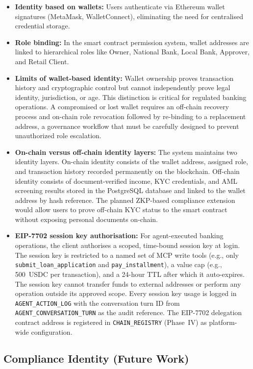 \documentclass[12pt,a4paper]{report}
\begin{document}
\begin{itemize}[noitemsep]
\item \textbf{Identity based on wallets:} Users authenticate via Ethereum wallet signatures (MetaMask, WalletConnect), eliminating the need for centralised credential storage.
\item \textbf{Role binding:} In the smart contract permission system, wallet addresses are linked to hierarchical roles like Owner, National Bank, Local Bank, Approver, and Retail Client.
\item \textbf{Limits of wallet-based identity:} Wallet ownership proves transaction history and cryptographic control but cannot independently prove legal identity, jurisdiction, or age. This distinction is critical for regulated banking operations. A compromised or lost wallet requires an off-chain recovery process and on-chain role revocation followed by re-binding to a replacement address, a governance workflow that must be carefully designed to prevent unauthorized role escalation.
\item \textbf{On-chain versus off-chain identity layers:} The system maintains two identity layers. On-chain identity consists of the wallet address, assigned role, and transaction history recorded permanently on the blockchain. Off-chain identity consists of document-verified income, KYC credentials, and AML screening results stored in the PostgreSQL database and linked to the wallet address by hash reference. The planned ZKP-based compliance extension would allow users to prove off-chain KYC status to the smart contract without exposing personal documents on-chain.
\item \textbf{EIP-7702 session key authorisation:} For agent-executed banking operations, the client authorises a scoped, time-bound session key at login. The session key is restricted to a named set of MCP write tools (e.g., only \texttt{submit\_loan\_application} and \texttt{pay\_installment}), a value cap (e.g., 500~USDC per transaction), and a 24-hour TTL after which it auto-expires. The session key cannot transfer funds to external addresses or perform any operation outside its approved scope. Every session key usage is logged in \texttt{AGENT\_ACTION\_LOG} with the conversation turn ID from \texttt{AGENT\_CONVERSATION\_TURN} as the audit reference. The EIP-7702 delegation contract address is registered in \texttt{CHAIN\_REGISTRY} (Phase~IV) as platform-wide configuration.
\end{itemize}

\subsection{Compliance Identity (Future Work)}
\label{sec:identity}
\end{document}

